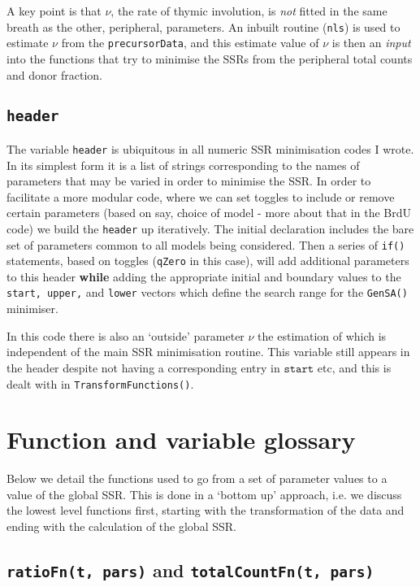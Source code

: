 \documentclass{tufte-book} %
\begin{document}
A key point is that $\nu$, the rate of thymic involution, is \textit{not} fitted in the same breath as the other, peripheral, parameters. An inbuilt routine (\texttt{nls}) is used to estimate $\nu$ from the \texttt{precursorData}, and this estimate value of $\nu$ is then an \textit{input} into the functions that try to minimise the SSRs from the peripheral total counts and donor fraction.

\subsection{ \texttt{header}}
The variable \texttt{header} is ubiquitous in all numeric SSR minimisation codes I wrote. In its simplest form it is a list of strings corresponding to the names of parameters that may be varied in order to minimise the SSR. In order to facilitate a more modular code, where we can set toggles to include or remove certain parameters (based on say, choice of model - more about that in the BrdU code) we build the \texttt{header} up iteratively. The initial declaration includes the bare set of parameters common to all models being considered. Then a series of \texttt{if()} statements, based on toggles (\texttt{qZero} in this case), will add additional parameters to this header \textbf{while} adding the appropriate initial and boundary values to the \texttt{start, upper,} and \texttt{lower} vectors which define the search range for the \texttt{GenSA()} minimiser. 

In this code there is also an `outside' parameter $\nu$ the estimation of which is independent of the main SSR minimisation routine. This variable still appears in the header despite not having a corresponding entry in $\texttt{start}$ etc, and this is dealt with in \texttt{TransformFunctions()}.
\section{Function and variable glossary}
Below we detail the functions used to go from a set of parameter values to a value of the global SSR. This is done in a `bottom up' approach, i.e. we discuss the lowest level functions first, starting with the transformation of the data and ending with the calculation of the global SSR.
\subsection{\texttt{ratioFn(t, pars)} and \texttt{totalCountFn(t, pars)}}
\end{document}

